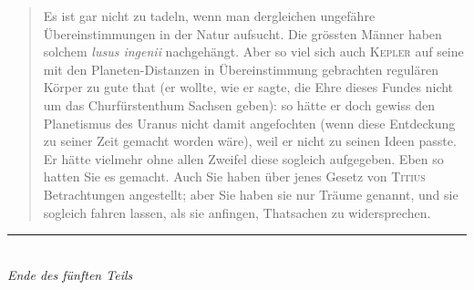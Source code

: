 \documentclass[11pt,a4paper]{book}
\begin{document}
\begin{quotation}
Es ist gar nicht zu tadeln, wenn man dergleichen ungefähre Übereinstimmungen in der Natur aufsucht. Die grössten Männer haben solchem \textit{lusus ingenii} nachgehängt. Aber so viel sich auch \textsc{Kepler} auf seine mit den Planeten-Distanzen in Übereinstimmung gebrachten regulären Körper zu gute that (er wollte, wie er sagte, die Ehre dieses Fundes nicht um das Churfürstenthum Sachsen geben): so hätte er doch gewiss den Planetismus des Uranus nicht damit angefochten (wenn diese Entdeckung zu seiner Zeit gemacht worden wäre), weil er nicht zu seinen Ideen passte. Er hätte vielmehr ohne allen Zweifel diese sogleich aufgegeben. Eben so hatten Sie es gemacht. Auch Sie haben über jenes Gesetz von \textsc{Titius} Betrachtungen angestellt; aber Sie haben sie nur Träume genannt, und sie sogleich fahren lassen, als sie anfingen, Thatsachen zu widersprechen.\grqq
\end{quotation}

\vfill
\begin{center}
\rule{0.5\textwidth}{0.4pt}\\[0.5em]
\textit{Ende des fünften Teils}
\end{center}
\end{document}
